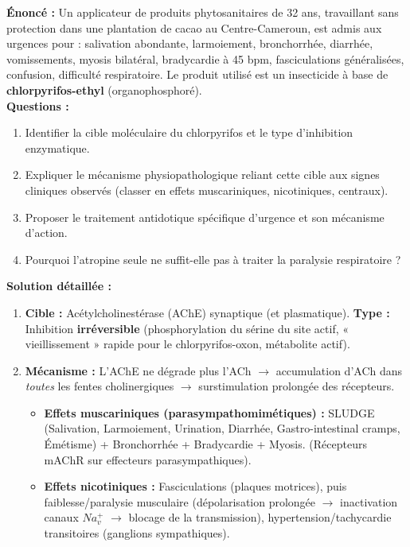 \documentclass[11pt]{article}
\begin{document}
\begin{exoresolu}
\textbf{Énoncé :} Un applicateur de produits phytosanitaires de 32 ans, travaillant sans protection dans une plantation de cacao au Centre-Cameroun, est admis aux urgences pour : salivation abondante, larmoiement, bronchorrhée, diarrhée, vomissements, myosis bilatéral, bradycardie à 45 bpm, fasciculations généralisées, confusion, difficulté respiratoire. Le produit utilisé est un insecticide à base de \textbf{chlorpyrifos-ethyl} (organophosphoré).\\
\textbf{Questions :}
\begin{enumerate}
    \item Identifier la cible moléculaire du chlorpyrifos et le type d'inhibition enzymatique.
    \item Expliquer le mécanisme physiopathologique reliant cette cible aux signes cliniques observés (classer en effets muscariniques, nicotiniques, centraux).
    \item Proposer le traitement antidotique spécifique d'urgence et son mécanisme d'action.
    \item Pourquoi l'atropine seule ne suffit-elle pas à traiter la paralysie respiratoire ?
\end{enumerate}
\tcblower
\textbf{Solution détaillée :}
\begin{enumerate}
    \item \textbf{Cible :} Acétylcholinestérase (AChE) synaptique (et plasmatique). \textbf{Type :} Inhibition \textbf{irréversible} (phosphorylation du sérine du site actif, « vieillissement » rapide pour le chlorpyrifos-oxon, métabolite actif).
    \item \textbf{Mécanisme :} L'AChE ne dégrade plus l'ACh $\rightarrow$ accumulation d'ACh dans \emph{toutes} les fentes cholinergiques $\rightarrow$ surstimulation prolongée des récepteurs.
    \begin{itemize}
        \item \textbf{Effets muscariniques (parasympathomimétiques) :} SLUDGE (Salivation, Larmoiement, Urination, Diarrhée, Gastro-intestinal cramps, Émétisme) + Bronchorrhée + Bradycardie + Myosis. (Récepteurs mAChR sur effecteurs parasympathiques).
        \item \textbf{Effets nicotiniques :} Fasciculations (plaques motrices), puis faiblesse/paralysie musculaire (dépolarisation prolongée $\rightarrow$ inactivation canaux $Na_v^+$ $\rightarrow$ blocage de la transmission), hypertension/tachycardie transitoires (ganglions sympathiques).

\end{itemize}
\end{enumerate}
\end{exoresolu}
\end{document}
